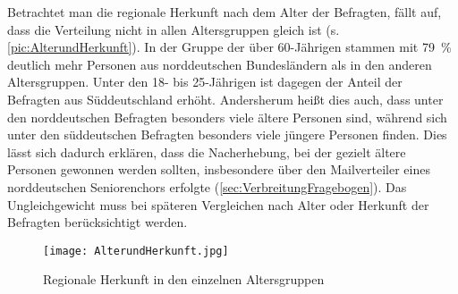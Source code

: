Betrachtet man die regionale Herkunft nach dem Alter der Befragten, fällt auf, dass die Verteilung nicht in allen Altersgruppen gleich ist (s. \autoref{pic:AlterundHerkunft}). 
In der Gruppe der über 60-Jährigen stammen mit 79~\% deutlich mehr Personen aus norddeutschen Bundesländern als in den anderen Altersgruppen. 
Unter den 18- bis 25-Jährigen ist dagegen der Anteil der Befragten aus Süddeutschland erhöht. 
Andersherum heißt dies auch, dass unter den norddeutschen Befragten besonders viele ältere Personen sind, während sich unter den süddeutschen Befragten besonders viele jüngere Personen finden. 
Dies lässt sich dadurch erklären, dass die Nacherhebung, bei der gezielt ältere Personen gewonnen werden sollten, insbesondere über den Mailverteiler eines norddeutschen Seniorenchors erfolgte (\autoref{sec:VerbreitungFragebogen}). 
Das Ungleichgewicht muss bei späteren Vergleichen nach Alter oder Herkunft der Befragten berücksichtigt werden. 
\begin{figure}
\centering
\texttt{[image: AlterundHerkunft.jpg]}
\caption{Regionale Herkunft in den einzelnen Altersgruppen}
\label{pic:AlterundHerkunft}
\end{figure}

